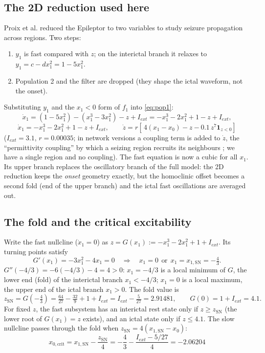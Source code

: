 \documentclass[11pt]{article}
\newcommand{\xc}{x_{0,\mathrm{crit}}}
\newcommand{\zsn}{z_{\mathrm{SN}}}
\newcommand{\xsn}{x_{1,\mathrm{SN}}}
\begin{document}
\subsection{The 2D reduction used here}
Proix et al. \cite{proix2014} reduced the Epileptor to two variables to study seizure propagation across regions.
Two steps:
\begin{enumerate}
\item $y_1$ is fast compared with $z$; on the interictal branch it relaxes to $y_1 = c - d x_1^2 = 1 - 5x_1^2$.
\item Population 2 and the filter are dropped (they shape the ictal waveform, not the onset).
\end{enumerate}
Substituting $y_1$ and the $x_1<0$ form of $f_1$ into \eqref{eq:pop1}:
\[
\dot x_1 = (1 - 5x_1^2) - (x_1^3 - 3x_1^2) - z + I_{ext}
        = -x_1^3 - 2x_1^2 + 1 - z + I_{ext},
\]
\begin{equation}\boxed{\;\dot x_1 = -x_1^3 - 2x_1^2 + 1 - z + I_{ext}, \qquad
\dot z = r\left[\,4(x_1 - x_0) - z - 0.1\,z^7\mathbf 1_{z<0}\right]\;}\label{eq:2d}\end{equation}
($I_{ext}=3.1$, $r=0.00035$; in network versions a coupling term is added to $\dot z$, the ``permittivity coupling'' by
which a seizing region recruits its neighbours \cite{proix2014}; we have a single region and no coupling).
The fast equation is now a cubic for all $x_1$. Its upper branch replaces the oscillatory branch of the full model:
the 2D reduction keeps the \emph{onset} geometry exactly, but the homoclinic offset becomes a second fold (end of the
upper branch) and the ictal fast oscillations are averaged out.

\subsection{The fold and the critical excitability}\label{sec:fold}
Write the fast nullcline ($\dot x_1=0$) as $z = G(x_1) := -x_1^3 - 2x_1^2 + 1 + I_{ext}$. Its turning points satisfy
\[
G'(x_1) = -3x_1^2 - 4x_1 = 0 \quad\Rightarrow\quad x_1 = 0 \ \ \text{or}\ \ x_1 = \xsn = -\tfrac43 .
\]
$G''(-4/3) = -6(-4/3) - 4 = 4 > 0$: $x_1=-4/3$ is a local minimum of $G$, the lower end (fold) of the interictal
branch $x_1 < -4/3$; $x_1 = 0$ is a local maximum, the upper end of the ictal branch $x_1>0$. The fold value is
\[
\zsn = G(-\tfrac43) = \tfrac{64}{27} - \tfrac{32}{9} + 1 + I_{ext} = I_{ext} - \tfrac{5}{27} = 2.91481,
\qquad G(0) = 1 + I_{ext} = 4.1 .
\]
For fixed $z$, the fast subsystem has an interictal rest state only if $z \ge \zsn$ (the lower root of $G(x_1)=z$
exists), and an ictal state only if $z \le 4.1$. The slow nullcline passes through the fold when
$\zsn = 4(\xsn - x_0)$:
\begin{equation}\boxed{\;\xc = \xsn - \frac{\zsn}{4} = -\frac43 - \frac{I_{ext} - 5/27}{4} = -2.06204\;}\label{eq:xc}\end{equation}
\end{document}
